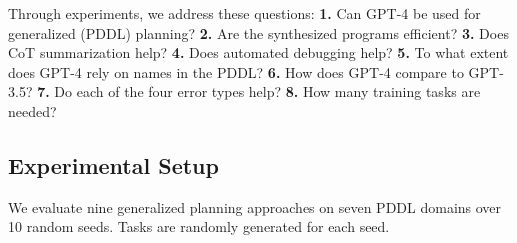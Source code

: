\documentclass[letterpaper]{article} %
\begin{document}




Through experiments, we address these questions:
\textbf{1.} Can GPT-4 be used for generalized (PDDL) planning?
\textbf{2.} Are the synthesized programs efficient?
\textbf{3.} Does CoT summarization help?
\textbf{4.} Does automated debugging help?
\textbf{5.} To what extent does GPT-4 rely on names in the PDDL?
\textbf{6.} How does GPT-4 compare to GPT-3.5?
\textbf{7.} Do each of the four error types help?
\textbf{8.} How many training tasks are needed?

\subsection{Experimental Setup}
We evaluate nine generalized planning approaches on seven PDDL domains over 10 random seeds.
Tasks are randomly generated for each seed.
\end{document}
